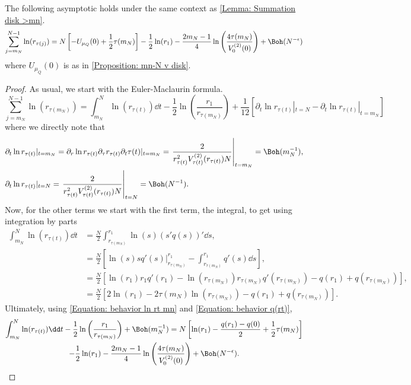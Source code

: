 \begin{proposicao}	\label{Proposition: mn-N lnr disk}
	The following asymptotic holds under the same context as \autoref{Lemma: Summation disk >mn}.
	\begin{equation}
		\sum_{j=m_N}^{N-1} \ln(r_{\tau(j)}) = N \left[- U_{\mu_Q}(0) + \frac{1}{2} \tau(m_N)\right] - \frac{1}{2} \ln(r_1) - \frac{2 m_N - 1}{4} \ln\left( \frac{4 \tau(m_N)}{V^{(2)}_0(0)} \right) + \Boh(N^{-\epsilon})
	\end{equation}
	where $U_{\mu_Q}(0)$ is as in \autoref{Proposition: mn-N v disk}.
\end{proposicao}
\begin{proof}
	As usual, we start with the Euler-Maclaurin formula.
	\begin{equation}
		\sum_{j = m_N}^{N-1} \ln(r_{\tau(m_N)}) = \int_{m_N}^{N} \ln(r_{\tau(t)}) \dd t - \frac{1}{2} \ln\left( \frac{r_1}{r_{\tau(m_N)}}\right) + \frac{1}{12} \left[ \partial_t \ln r_{\tau(t)} |_{t = N} - \partial_t \ln r_{\tau(t)} |_{t = m_N} \right]
	\end{equation} 
	where we directly note that
	\begin{align}
		& \partial_t \ln r_{\tau(t)} |_{t = m_N} = \partial_r \ln r_{\tau(t)} \partial_\tau r_{\tau(t)} \partial_t \tau(t) |_{t = m_N} = \left. \frac{2}{r_{\tau(t)}^2 V^{(2)}_{\tau(t)}(r_{\tau(t)}) N} \right|_{t = m_N} = \Boh(m_N^{-1}), \\
		& \partial_t \ln r_{\tau(t)} |_{t = N} = \left. \frac{2}{r_{\tau(t)}^2 V^{(2)}_{\tau(t)}(r_{\tau(t)}) N} \right|_{t = N} = \Boh(N^{-1}).
	\end{align}
	Now, for the other terms we start with the first term, the integral, to get using integration by parts
	\begin{align}
		 \int_{m_N}^{N} \ln(r_{\tau(t)}) \dd t & = \frac{N}{2}  \int_{r_{\tau(m_N)}}^{r_1} \ln(s) (s' q(s))' \dd s, \\ 
		 & = \frac{N}{2} \left[ \ln(s) s q'(s) \big|_{r_{\tau(m_N)}}^{r_1} -  \int_{r_{\tau(m_N)}}^{r_1} q'(s) \dd s \right], \\
		 & = \frac{N}{2} \left[ \ln(r_1) r_1 q'(r_1) - \ln(r_{\tau(m_N)}) r_{\tau(m_N)} q'(r_{\tau(m_N)}) - q(r_1) + q(r_{\tau(m_N)})\right], \\
		 & = \frac{N}{2} \left[ 2 \ln(r_1) - 2 \tau(m_N)  \ln(r_{\tau(m_N)}) - q(r_1) + q(r_{\tau(m_N)}) \right].
	\end{align}
	Ultimately, using \eqref{Equation: behavior ln rt mn} and \eqref{Equation: behavior q(rt)}, 
	\begin{multline}
		\int_{m_N}^{N} \ln(r_{\tau(t)}) \dd t - \frac{1}{2} \ln\left( \frac{r_1}{r_{\tau(m_N)}}\right) + \Boh(m_N^{-1}) = N \left[ \ln(r_1) - \frac{q(r_1) - q(0)}{2} + \frac{1}{2} \tau(m_N)\right] \\ - \frac{1}{2} \ln(r_1) - \frac{2 m_N - 1}{4} \ln\left( \frac{4 \tau(m_N)}{V^{(2)}_0(0)} \right) + \Boh(N^{-\epsilon}).
	\end{multline}
\end{proof}

